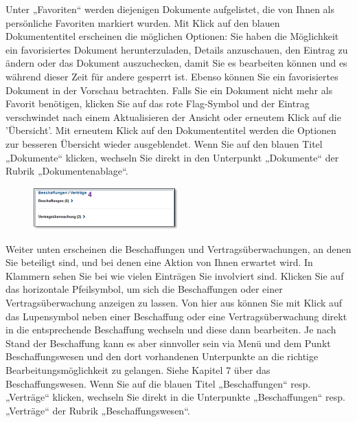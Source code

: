Unter „Favoriten“ werden diejenigen Dokumente aufgelistet, die von Ihnen als persönliche Favoriten markiert wurden. Mit Klick auf den blauen Dokumententitel erscheinen die möglichen Optionen: Sie haben die Möglichkeit ein favorisiertes Dokument herunterzuladen, Details anzuschauen, den Eintrag zu ändern oder das Dokument auszuchecken, damit Sie es bearbeiten können und es während dieser Zeit für andere gesperrt ist. Ebenso können Sie ein favorisiertes Dokument in der Vorschau betrachten. Falls Sie ein Dokument nicht mehr als Favorit benötigen, klicken Sie auf das rote Flag-Symbol und der Eintrag verschwindet nach einem Aktualisieren der Ansicht oder erneutem Klick auf die 'Übersicht'. Mit erneutem Klick auf den Dokumententitel werden die Optionen zur besseren Übersicht wieder ausgeblendet. Wenn Sie auf den blauen Titel „Dokumente“  klicken, wechseln Sie direkt in den Unterpunkt „Dokumente“ der Rubrik „Dokumentenablage“.

\vspace{\baselineskip}


\begin{figure}
  \vspace{-20pt}
  \begin{center}
    \includegraphics[width=0.5\textwidth]{../chapters/01_Einfuehrung/pictures/1-3-2_persUebersichtBeschaffung.jpg}
  \end{center}
  \vspace{-20pt}
  \vspace{-10pt}
\end{figure}
Weiter unten erscheinen die Beschaffungen  und Vertragsüberwachungen, an denen Sie beteiligt sind, und bei denen eine Aktion von Ihnen erwartet wird. In Klammern sehen Sie bei wie vielen Einträgen Sie involviert sind. Klicken Sie auf das horizontale Pfeilsymbol, um sich die Beschaffungen oder einer Vertragsüberwachung anzeigen zu lassen. Von hier aus können Sie mit Klick auf das Lupensymbol neben einer Beschaffung oder eine Vertragsüberwachung direkt in die entsprechende Beschaffung wechseln und diese dann bearbeiten. Je nach Stand der Beschaffung kann es aber sinnvoller sein via Menü und dem Punkt Beschaffungswesen und den dort vorhandenen Unterpunkte an die richtige Bearbeitungsmöglichkeit zu gelangen. Siehe Kapitel 7 über das Beschaffungswesen. Wenn Sie auf die blauen Titel „Beschaffungen“ resp. „Verträge“  klicken, wechseln Sie direkt in die Unterpunkte „Beschaffungen“ resp. „Verträge“ der Rubrik „Beschaffungswesen“.


